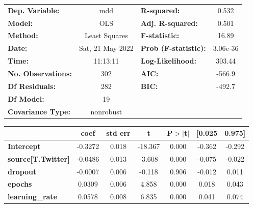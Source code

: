 \begin{center}
\begin{tabular}{lclc}
\toprule
\textbf{Dep. Variable:}                   &       mdd        & \textbf{  R-squared:         } &     0.532   \\
\textbf{Model:}                           &       OLS        & \textbf{  Adj. R-squared:    } &     0.501   \\
\textbf{Method:}                          &  Least Squares   & \textbf{  F-statistic:       } &     16.89   \\
\textbf{Date:}                            & Sat, 21 May 2022 & \textbf{  Prob (F-statistic):} &  3.06e-36   \\
\textbf{Time:}                            &     11:13:11     & \textbf{  Log-Likelihood:    } &    303.44   \\
\textbf{No. Observations:}                &         302      & \textbf{  AIC:               } &    -566.9   \\
\textbf{Df Residuals:}                    &         282      & \textbf{  BIC:               } &    -492.7   \\
\textbf{Df Model:}                        &          19      & \textbf{                     } &             \\
\textbf{Covariance Type:}                 &    nonrobust     & \textbf{                     } &             \\
\bottomrule
\end{tabular}
\begin{tabular}{lcccccc}
                                          & \textbf{coef} & \textbf{std err} & \textbf{t} & \textbf{P$> |$t$|$} & \textbf{[0.025} & \textbf{0.975]}  \\
\midrule
\textbf{Intercept}                        &      -0.3272  &        0.018     &   -18.367  &         0.000        &       -0.362    &       -0.292     \\
\textbf{source[T.Twitter]}                &      -0.0486  &        0.013     &    -3.608  &         0.000        &       -0.075    &       -0.022     \\
\textbf{dropout}                          &      -0.0007  &        0.006     &    -0.118  &         0.906        &       -0.012    &        0.011     \\
\textbf{epochs}                           &       0.0309  &        0.006     &     4.858  &         0.000        &        0.018    &        0.043     \\
\textbf{learning\_rate}                   &       0.0578  &        0.008     &     6.835  &         0.000        &        0.041    &        0.074     \\

\end{tabular}
\end{center}
